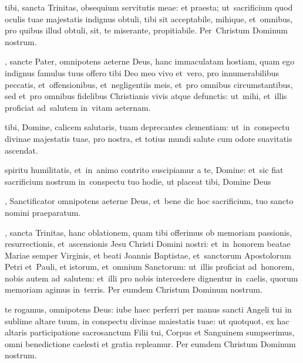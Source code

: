 \documentclass[first]{../altarcard}
\begin{document}
\begin{center}
\begin{minipage}[t]{0.25\linewidth}
	\end{minipage}
	\hspace*{0.8cm}
	\begin{minipage}[t]{0.29\linewidth}

		\topgap

		 tibi, sancta Trinitas, obsequium servitutis meae: et
		praesta; ut~sacrificium quod oculis tuae majestatis indignus obtuli,
		tibi sit acceptabile, mihique, et~omnibus, pro quibus illud obtuli,
		sit, te miserante, propitiabile. Per~Christum Dominum nostrum. \amen

		\gap

		, sancte Pater, omnipotens aeterne Deus, hanc
		immaculatam hostiam, quam ego indignus famulus tuus offero tibi Deo
		meo vivo et~vero, pro innumerabilibus peccatis, et~offensionibus,
		et~negligentiis meis, et~pro omnibus circumstantibus, sed et~pro
		omnibus fidelibus Christianis vivis atque defunctis: ut~mihi,
		et~illis proficiat ad~salutem in~vitam aeternam.
		\amen

		\gap

		 tibi, Domine, calicem salutaris, tuam deprecantes
		clementiam: ut~in~conspectu divinae majestatis tuae, pro nostra, et
		totius mundi salute cum odore suavitatis ascendat. \amen

		\gap

		 spiritu humilitatis, et~in~animo contrito suscipiamur a
		te, Domine: et~sic fiat sacrificium nostrum in~conspectu tuo hodie, ut
		placeat tibi, Domine Deus

		\gap

		, Sanctificator omnipotens aeterne Deus, et~bene\cross
		dic hoc sacrificium, tuo sancto nomini praeparatum.

		\gap

		, sancta Trinitas, hanc oblationem, quam tibi
		offerimus ob memoriam passionis, resurrectionis, et~ascensionis Jesu
		Christi Domini nostri: et~in~honorem beatae Mariae semper Virginis, et
		beati Joannis Baptistae, et~sanctorum Apostolorum Petri et~Pauli, et
		istorum, et~omnium Sanctorum: ut~illis proficiat ad~honorem, nobis autem
		ad~salutem: et~illi pro nobis intercedere dignentur in~caelis, quorum
		memoriam agimus in~terris. Per eumdem Christum Dominum nostrum. \amen

		\gap

		 te rogamus, omnipotens Deus: iube haec perferri
		per manus sancti Angeli tui in sublime altare tuum, in conspectu divinae
		maiestatis tuae: ut quotquot, ex hac altaris participatione sacrosanctum
		Filii tui, Cor\cross pus et San\cross guinem sumpserimus, omni
		bene\cross dictione caelesti et gratia repleamur. Per eumdem Christum
		Dominum nostrum. \amen

	\end{minipage}
\end{center}

\end{document}
